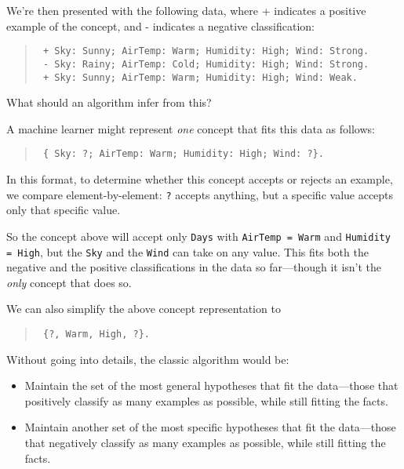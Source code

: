 {{{
 We're then presented with the following data,
where + indicates a positive example of the concept, and - indicates a
negative classification:}

\begin{verse}
\texttt{ + Sky: Sunny; AirTemp: Warm; Humidity: High; Wind: Strong. } \\
\texttt{ - Sky: Rainy; AirTemp: Cold; Humidity: High; Wind: Strong. } \\
\texttt{ + Sky: Sunny; AirTemp: Warm; Humidity: High; Wind: Weak. } \\
\end{verse}

{
 What should an algorithm infer from this?}

{
 A machine learner might represent \textit{one} concept that fits
this data as follows:}

\begin{verse}
  \texttt{ \{ Sky: ?; AirTemp: Warm; Humidity: High; Wind: ?\}. }\\
\end{verse}

{
 In this format, to determine whether this concept accepts or
rejects an example, we compare element-by-element: \texttt{?} accepts anything,
but a specific value accepts only that specific value.}

{
 So the concept above will accept only \texttt{Days} with \texttt{AirTemp = Warm} and
\texttt{Humidity = High}, but the \texttt{Sky} and the \texttt{Wind} can take on any value. This
fits both the negative and the positive classifications in the data so
far---though it isn't the \textit{only} concept that
does so.}

{
 We can also simplify the above concept representation to}

\begin{verse}
\texttt{ \{?, Warm, High, ?\}.}
\end{verse}


{
 Without going into details, the classic algorithm would be:}

\begin{itemize}
\item{
 Maintain the set of the most general hypotheses that fit the
data---those that positively classify as many examples as possible,
while still fitting the facts.}

\item{
 Maintain another set of the most specific hypotheses that fit the
data---those that negatively classify as many examples as possible,
while still fitting the facts.}


\end{itemize}}}
